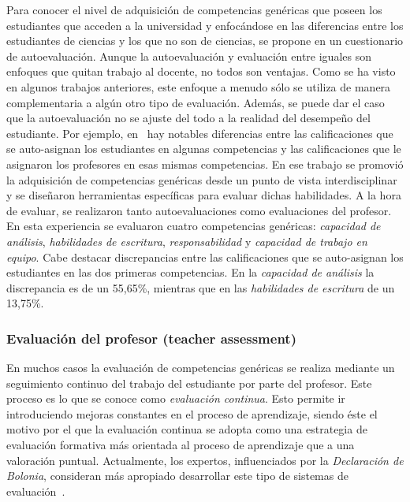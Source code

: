 Para conocer el nivel de adquisición de competencias genéricas que poseen los estudiantes que acceden a la universidad y enfocándose en las diferencias entre los estudiantes de ciencias y los que no son de ciencias, se propone en \cite{so2011mapping} un cuestionario de autoevaluación. Aunque la autoevaluación y evaluación entre iguales son enfoques que quitan trabajo al docente, no todos son ventajas. Como se ha visto en algunos trabajos anteriores, este enfoque a menudo sólo se utiliza de manera complementaria a algún otro tipo de evaluación. Además, se puede dar el caso que la autoevaluación no se ajuste del todo a la realidad del desempeño del estudiante. Por ejemplo, en~\cite{carreras2013promotion} hay notables diferencias entre las calificaciones que se auto-asignan los estudiantes en algunas competencias y las calificaciones que le asignaron los profesores en esas mismas competencias. En ese trabajo se promovió la adquisición de competencias genéricas desde un punto de vista interdisciplinar y se diseñaron herramientas específicas para evaluar dichas habilidades. A la hora de evaluar, se realizaron tanto autoevaluaciones como evaluaciones del profesor. En esta experiencia se evaluaron cuatro competencias genéricas: \emph{capacidad de análisis},  \emph{habilidades de escritura}, \emph{responsabilidad} y \emph{capacidad de trabajo en equipo}. Cabe destacar discrepancias entre las calificaciones que se auto-asignan los estudiantes en las dos primeras competencias. En la \emph{capacidad de análisis} la discrepancia es de un 55,65\%, mientras que en las \emph{habilidades de escritura} de un 13,75\%.

\subsubsection{Evaluación del profesor (teacher assessment)}

En muchos casos la evaluación de competencias genéricas se realiza mediante un seguimiento continuo del trabajo del estudiante por parte del profesor. Este proceso es lo que se conoce como \emph{evaluación continua}. Esto permite ir introduciendo mejoras constantes en el proceso de aprendizaje, siendo éste el motivo por el que la evaluación continua se adopta como una estrategia de evaluación formativa más orientada al proceso de aprendizaje que a una valoración puntual. Actualmente, los expertos, influenciados por la \emph{Declaración de Bolonia}, consideran más apropiado desarrollar este tipo de sistemas de evaluación~\cite{garcia2005competencias}. 

